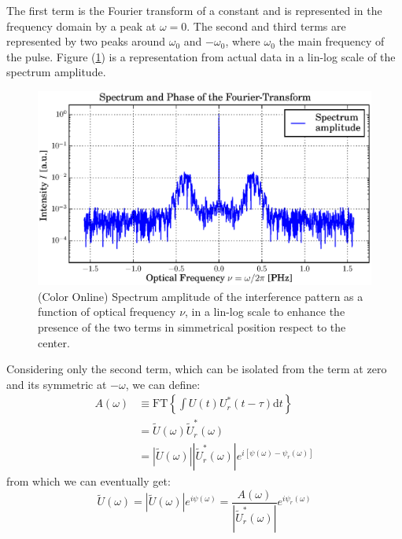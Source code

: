 \documentclass[12pt,a4paper,twoside]{article}
\begin{document}
The first term is the Fourier transform of a constant and is represented in the frequency domain by a peak at $\omega = 0$.
The second and third terms are represented by two peaks around $\omega_0$ and $-\omega_0$, where $\omega_0$ the main frequency of the pulse.
Figure (\ref{fig_spectrum}) is a representation from actual data in a lin-log scale of the spectrum amplitude.

\begin{figure}[h!]
	\centering
	\includegraphics[scale=.9]{data/spectrum_linlog.eps}
	\caption{(Color Online) Spectrum amplitude of the interference pattern as a function of optical frequency $\nu$, in a lin-log scale to enhance the presence of the two terms in simmetrical position respect to the center.}
	\label{fig_spectrum}
\end{figure}

Considering only the second term, which can be isolated from the term at zero and its symmetric at $-\omega$, we can define:
\begin{align}
	A(\omega) 	&\equiv \mathrm{FT} \left\lbrace \int U(t)U_r^*(t-\tau)\mathrm{d}t \right\rbrace \\
				&= \tilde{U}(\omega)\tilde{U}_r^*(\omega) \nonumber\\
				&= |\tilde{U}(\omega)||\tilde{U}_r^*(\omega)|e^{i[\psi(\omega)-\psi_r(\omega)]}
\end{align}
from which we can eventually get:
\begin{equation}
	\tilde{U}(\omega) = |\tilde{U}(\omega)|e^{i\psi(\omega)} = \frac{A(\omega)}{|\tilde{U}_r^*(\omega)|}e^{i\psi_r(\omega)}
\end{equation}
\end{document}
